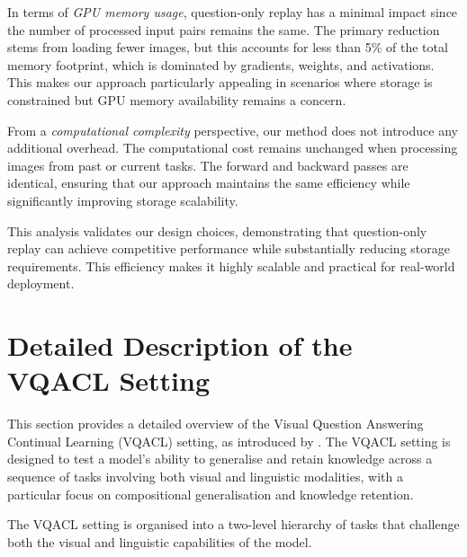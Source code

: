 In terms of \textit{GPU memory usage}, question-only replay has a minimal impact since the number of processed input pairs remains the same. The primary reduction stems from loading fewer images, but this accounts for less than 5\% of the total memory footprint, which is dominated by gradients, weights, and activations. This makes our approach particularly appealing in scenarios where storage is constrained but GPU memory availability remains a concern.  

From a \textit{computational complexity} perspective, our method does not introduce any additional overhead. The computational cost remains unchanged when processing images from past or current tasks. The forward and backward passes are identical, ensuring that our approach maintains the same efficiency while significantly improving storage scalability.  

This analysis validates our design choices, demonstrating that question-only replay can achieve competitive performance while substantially reducing storage requirements. This efficiency makes it highly scalable and practical for real-world deployment.

\section{Detailed Description of the VQACL Setting}
\label{sec:details_setting}

This section provides a detailed overview of the Visual Question Answering Continual Learning (VQACL) setting, as introduced by \cite{zhang2023vqacl}. The VQACL setting is designed to test a model's ability to generalise and retain knowledge across a sequence of tasks involving both visual and linguistic modalities, with a particular focus on compositional generalisation and knowledge retention.

The VQACL setting is organised into a two-level hierarchy of tasks that challenge both the visual and linguistic capabilities of the model.

